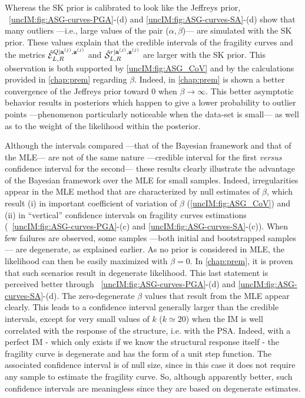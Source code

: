   Whereas the SK prior is calibrated to look like the Jeffreys prior, ~\ref{uncIM:fig:ASG-curves-PGA}-(d) and \ref{uncIM:fig:ASG-curves-SA}-(d) show that many outliers ---i.e., large values of the pair ($\alpha,\beta$)--- are simulated with the SK prior. These values explain that the credible intervals of the fragility curves and the metrics $\hat{\mathcal{E}}_{L,R}^{Q|\mathbf{a}^{(j)},\mathbf{z}^{(j)}}$ and $\hat{\mathcal{S}}_{L,R}^{r|\mathbf{a}^{(j)},\mathbf{z}^{(j)}}$ are larger with the SK prior. This observation is both supported by \cref{uncIM:fig:ASG_CoV} and by the calculations provided in \cref{chap:prem} regarding $\beta$. Indeed, in \cref{chap:prem} is shown a better convergence of the Jeffreys prior toward $0$ when $\beta\to\infty$. This better  asymptotic behavior results in posteriors which happen to give a lower probability to outlier points  ---phenomenon particularly noticeable when the data-set is small--- as well as to the weight of the likelihood within the posterior.
  
  Although the intervals compared ---that of the Bayesian framework and that of the MLE--- are not of the same nature ---credible interval for the first \emph{versus} confidence interval for the second--- these results clearly illustrate the advantage of the Bayesian framework over the MLE for small samples. Indeed, irregularities appear in the MLE method that are characterized by null estimates of $\beta$, which result (i) in important coefficient of variation of $\beta$  (\cref{uncIM:fig:ASG_CoV}) and (ii) in ``vertical'' confidence intervals on fragility curves estimations (~\ref{uncIM:fig:ASG-curves-PGA}-(c) and \ref{uncIM:fig:ASG-curves-SA}-(c)). {When few failures are observed, some samples ---both initial and bootstrapped samples--- are degenerate, as explained earlier.} As no prior is considered in MLE, the likelihood can then be easily maximized with $\beta=0$. In \cref{chap:prem}, it is proven that such scenarios result in degenerate likelihood. This last statement is perceived better through ~\ref{uncIM:fig:ASG-curves-PGA}-(d) and \ref{uncIM:fig:ASG-curves-SA}-(d). The zero-degenerate $\beta$ values that result from the MLE appear clearly. This leads to a confidence interval generally larger than the credible intervals, except for very small values of $k$ ($k \simeq 20$) when the IM is well correlated with the response of the structure, i.e. with the PSA. Indeed, with a perfect IM - which only exists if we know the structural response itself - the fragility curve is degenerate and has the form of a unit step function. The associated confidence interval is of null size, since in this case it does not require any sample to estimate the fragility curve. So, although apparently better, such confidence intervals are meaningless since they are based on degenerate estimates.
  

